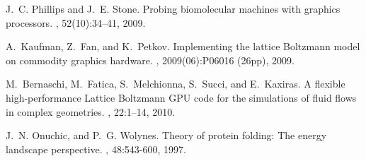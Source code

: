 \begin{thebibliography}{10}
J.~C. Phillips and J.~E. Stone.
\newblock Probing biomolecular machines with graphics processors.
, 52(10):34--41, 2009.

A.~Kaufman, Z.~Fan, and K.~Petkov.
\newblock Implementing the lattice {Boltzmann} model on commodity graphics
  hardware.
,
  2009(06):P06016 (26pp), 2009.

M.~Bernaschi, M.~Fatica, S.~Melchionna, S.~Succi, and E.~Kaxiras.
\newblock A flexible high-performance {Lattice Boltzmann GPU} code for the
  simulations of fluid flows in complex geometries.
, 22:1--14, 2010.

J.~N. Onuchic, and P.~G. Wolynes.
\newblock Theory of protein folding: The energy landscape perspective.
, 48:543-600, 1997.


\end{thebibliography}
